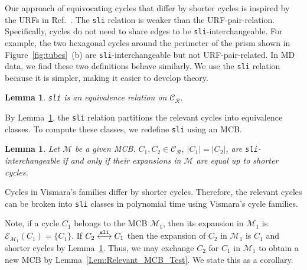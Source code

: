\documentclass[fleqn,11pt]{article}
\newtheorem{lemma}[theorem]{Lemma}
\newcommand\calM{\mathcal{M}}
\newcommand\RelCyc{\mathcal{C_R}} %
\newcommand\expand[2]{\mathcal{E}_{#1}\left(#2\right)}   %
\newcommand\slInt{ \stackrel{\tt sli}{\longleftrightarrow} }
\begin{document}
Our approach of equivocating cycles that differ by shorter cycles is inspired by the URFs in Ref.~\cite{kolodzikUnique2012}. 
The {\tt sli} relation is weaker than the URF-pair-relation.
Specifically, cycles do not need to share edges to be {\tt sli}-interchangeable. 
For example, the two hexagonal cycles around the perimeter of the prism shown in Figure~\ref{fig:tubes}~(b) are {\tt sli}-interchangeable but not URF-pair-related. 
In MD data, we find these two definitions behave similarly. 
We use the {\tt sli} relation because it is simpler, making it easier to develop theory.

\begin{lemma}
	{\tt sli} is an equivalence relation on $\mathcal{C}_{\mathcal{R}}$.
	\label{Lem:TrInt_Eq_Rel}
\end{lemma}

By Lemma~\ref{Lem:TrInt_Eq_Rel}, the {\tt sli} relation partitions the relevant cycles into equivalence classes. 
To compute these classes, we redefine {\tt sli} using an MCB.

\begin{lemma}
	\label{Lem:TrEx_Alg}
	Let $\calM$ be a given MCB. $C_1,C_2\in\RelCyc$, $|C_1|=|C_2|$, are {\tt sli}-interchangeable if and only if their expansions in $\calM$ are equal up to shorter cycles.
\end{lemma}

\noindent Cycles in Vismara's families differ by shorter cycles. Therefore, the relevant cycles can be broken into {\tt sli} classes in polynomial time using Vismara's cycle families.

Note, if a cycle $C_1$ belongs to the MCB $\calM_1$, then its expansion in $\calM_1$ is $\expand{\calM_1}{C_1}=\{C_1\}$. 
If $C_2\slInt C_1$ then the expansion of $C_2$ in $\calM_1$ is $C_1$ and shorter cycles by Lemma~\ref{Lem:TrEx_Alg}. 
Thus, we may exchange $C_2$ for $C_1$ in $\calM_1$ to obtain a new MCB by Lemma~\ref{Lem:Relevant_MCB_Test}. 
We state this as a corollary.
\end{document}

